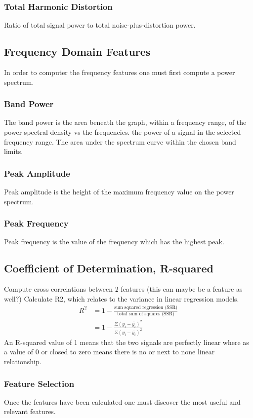 \documentclass{article}
\begin{document}
\subsubsection{Total Harmonic Distortion}
Ratio of total signal power to total noise-plus-distortion power.

\subsection{Frequency Domain Features}
In order to computer the frequency features one must first compute a power spectrum.
\subsubsection{Band Power}
The band power is the area beneath the graph, within a frequency range, of the power spectral density vs the frequencies.
the power of a signal in the selected frequency range.
The area under the spectrum curve within the chosen band limits.
\subsubsection{Peak Amplitude}
Peak amplitude is the height of the maximum frequency value on the power spectrum.
\subsubsection{Peak Frequency}
Peak frequency is the value of the frequency which has the highest peak.

\subsection{Coefficient of Determination, R-squared}
Compute cross correlations between 2 features (this can maybe be a feature as well?)
Calculate R2, which relates to the variance in linear regression models.
\begin{align*}
 R^2 &= 1 - \frac{\textrm{sum squared regression (SSR)}}{\textrm{total sum of squares (SSR)}} \\ 
 &= 1 - \frac{\Sigma(y_i - \hat{y_i})^2}{\Sigma(y_i - \bar{y_i})^2} 
\end{align*}
An R-squared value of 1 means that the two signals are perfectly linear where as a value of 0 or closed to zero means there is no or next to none linear relationship.
\subsubsection{Feature Selection}
Once the features have been calculated one must discover the most useful and relevant features. 
\end{document}
